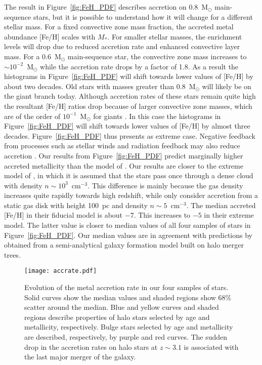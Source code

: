 \documentclass[a4paper,fleqn,usenatbib]{mnras}
\begin{document}
The result in Figure~\ref{fig:FeH_PDF} describes accretion on
0.8~M$_\odot$ main-sequence stars, but it is possible to understand
how it will change for a different stellar mass.  For a fixed
convective zone mass fraction, the accreted metal abundance [Fe/H]
scales with $M_*$.  For smaller stellar masses, the enrichment levels
will drop due to reduced accretion rate and enhanced convective layer
mass.  For a 0.6~M$_\odot$ main-sequence star, the convective zone
mass increases to $\sim 10^{-2}$~M$_\odot$ \citep{1981A&A....97..280Y}
while the accretion rate drops by a factor of 1.8.  As a result the
histograms in Figure~\ref{fig:FeH_PDF} will shift towards lower values
of [Fe/H] by about two decades.  Old stars with masses greater than
0.8~M$_\odot$ will likely be on the giant branch today.  Although
accretion rates of these stars remain quite high the resultant [Fe/H]
ratios drop because of larger convective zone masses, which are of the
order of $10^{-1}$~M$_\odot$ for giants \citep{1981A&A....97..280Y}.
In this case the histograms in Figure~\ref{fig:FeH_PDF} will shift
towards lower values of [Fe/H] by almost three decades.
Figure~\ref{fig:FeH_PDF} thus presents as extreme case.  Negative
feedback from processes such as stellar winds and radiation feedback
may also reduce accretion \citep{2015MNRAS.453.2771J,
  2011MNRAS.413.1184J}.  Our results from Figure~\ref{fig:FeH_PDF}
predict marginally higher accreted metallicity than the model of
\citet{2009MNRAS.392L..50F}.  Our results are closer to the extreme
model of \citet{2009MNRAS.392L..50F}, in which it is assumed that the
stars pass once through a dense cloud with density $n\sim
10^3$~cm$^{-3}$.  This difference is mainly because the gas density
increases quite rapidly towards high redshift, while
\citet{2009MNRAS.392L..50F} only consider accretion from a static gas
disk with height 100~pc and density $n\sim 5$~cm$^{-3}$.  The median
accreted [Fe/H] in their fiducial model is about $-7$.  This increases
to $-5$ in their extreme model.  The latter value is closer to median
values of all four samples of stars in Figure~\ref{fig:FeH_PDF}.  Our
median values are in agreement with predictions by
\citet{2015ApJ...808L..47K} obtained from a semi-analytical galaxy
formation model built on halo merger trees.

\begin{figure}
  \texttt{[image: accrate.pdf]}
  \caption{Evolution of the metal accretion rate in our four samples
    of stars.  Solid curves show the median values and shaded regions
    show 68\% scatter around the median.  Blue and yellow curves and
    shaded regions describe properties of halo stars selected by age
    and metallicity, respectively.  Bulge stars selected by age and
    metallicity are described, respectively, by purple and red curves.
    The sudden drop in the accretion rates on halo stars at $z\sim
    3.1$ is associated with the last major merger of the galaxy.}
  \label{fig:accrate}
\end{figure}
\end{document}
